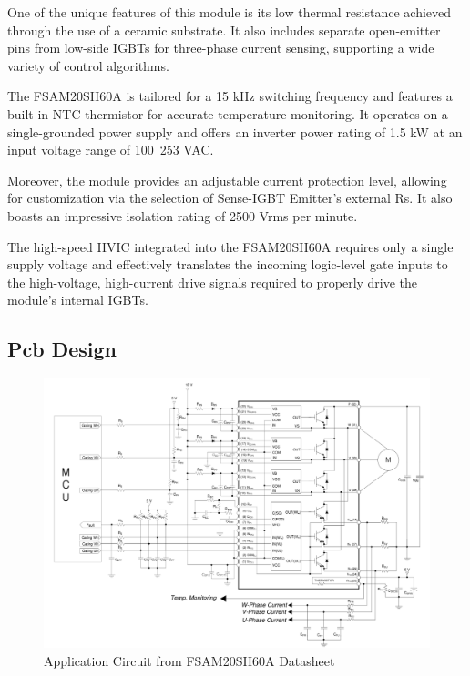 One of the unique features of this module is its low thermal resistance achieved through the use of a ceramic substrate. It also includes separate open-emitter pins from low-side IGBTs for three-phase current sensing, supporting a wide variety of control algorithms. 

The FSAM20SH60A is tailored for a 15 kHz switching frequency and features a built-in NTC thermistor for accurate temperature monitoring. It operates on a single-grounded power supply and offers an inverter power rating of 1.5 kW at an input voltage range of 100~253 VAC. 

Moreover, the module provides an adjustable current protection level, allowing for customization via the selection of Sense-IGBT Emitter's external Rs. It also boasts an impressive isolation rating of 2500 Vrms per minute. 

The high-speed HVIC integrated into the FSAM20SH60A requires only a single supply voltage and effectively translates the incoming logic-level gate inputs to the high-voltage, high-current drive signals required to properly drive the module's internal IGBTs. 



\subsection{Pcb Design}

\begin{figure}[H]
	\includegraphics[width=6in]{sections/section4/images/PCBDesign/ApplicationCircuitfromDatasheet.png}
	\caption{Application Circuit from FSAM20SH60A Datasheet}
\end{figure}

